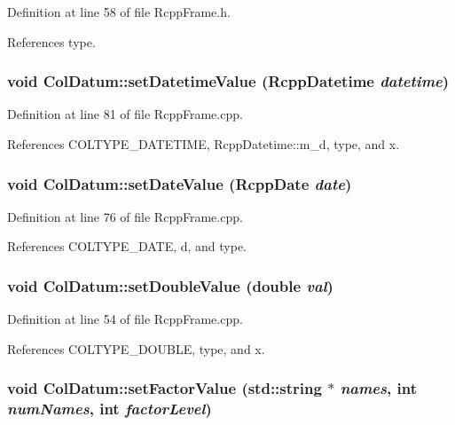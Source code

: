 Definition at line 58 of file RcppFrame.h.

References type.\hypertarget{classColDatum_a5803eb7a89dc467b88d7d412462c6fb5}{
\subsubsection[{setDatetimeValue}]{\setlength{\rightskip}{0pt plus 5cm}void ColDatum::setDatetimeValue ({\bf RcppDatetime} {\em datetime})}}
\label{classColDatum_a5803eb7a89dc467b88d7d412462c6fb5}


Definition at line 81 of file RcppFrame.cpp.

References COLTYPE\_\-DATETIME, RcppDatetime::m\_\-d, type, and x.\hypertarget{classColDatum_a988defa165f1d5ab7cde96d2c86c7c69}{
\subsubsection[{setDateValue}]{\setlength{\rightskip}{0pt plus 5cm}void ColDatum::setDateValue ({\bf RcppDate} {\em date})}}
\label{classColDatum_a988defa165f1d5ab7cde96d2c86c7c69}


Definition at line 76 of file RcppFrame.cpp.

References COLTYPE\_\-DATE, d, and type.\hypertarget{classColDatum_aedf3ac3ea399222524f02f3468ec97a0}{
\subsubsection[{setDoubleValue}]{\setlength{\rightskip}{0pt plus 5cm}void ColDatum::setDoubleValue (double {\em val})}}
\label{classColDatum_aedf3ac3ea399222524f02f3468ec97a0}


Definition at line 54 of file RcppFrame.cpp.

References COLTYPE\_\-DOUBLE, type, and x.\hypertarget{classColDatum_abd6f582044692c2215d9cd4add379ea1}{
\subsubsection[{setFactorValue}]{\setlength{\rightskip}{0pt plus 5cm}void ColDatum::setFactorValue (std::string $\ast$ {\em names}, \/  int {\em numNames}, \/  int {\em factorLevel})}}
\label{classColDatum_abd6f582044692c2215d9cd4add379ea1}



